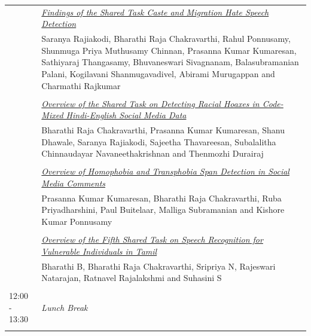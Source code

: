 \documentclass[11pt,oneside]{book}
\begin{document}
\begin{tabular}{p{24mm}p{124mm}}
                
                      & \hyperlink{page.214}{\emph{Findings of the Shared Task Caste and Migration Hate Speech Detection}}\\
        & Saranya Rajiakodi\index{Rajiakodi}, Bharathi Raja Chakravarthi\index{Chakravarthi}, Rahul Ponnusamy\index{Ponnusamy}, Shunmuga Priya Muthusamy Chinnan\index{Chinnan}, Prasanna Kumar Kumaresan\index{Kumaresan}, Sathiyaraj Thangasamy\index{Thangasamy}, Bhuvaneswari Sivagnanam\index{Sivagnanam}, Balasubramanian Palani\index{Palani}, Kogilavani Shanmugavadivel\index{Shanmugavadivel}, Abirami Murugappan\index{Murugappan} and Charmathi Rajkumar\index{Rajkumar}\\\\
                
                      & \hyperlink{page.221}{\emph{Overview of the Shared Task on Detecting Racial Hoaxes in Code-Mixed Hindi-English Social Media Data}}\\
        & Bharathi Raja Chakravarthi\index{Chakravarthi}, Prasanna Kumar Kumaresan\index{Kumaresan}, Shanu Dhawale\index{Dhawale}, Saranya Rajiakodi\index{Rajiakodi}, Sajeetha Thavareesan\index{Thavareesan}, Subalalitha Chinnaudayar Navaneethakrishnan\index{Navaneethakrishnan} and Thenmozhi Durairaj\index{Durairaj}\\\\
                
                      & \hyperlink{page.228}{\emph{Overview of Homophobia and Transphobia Span Detection in Social Media Comments}}\\
        & Prasanna Kumar Kumaresan\index{Kumaresan}, Bharathi Raja Chakravarthi\index{Chakravarthi}, Ruba Priyadharshini\index{Priyadharshini}, Paul Buitelaar\index{Buitelaar}, Malliga Subramanian\index{Subramanian} and Kishore Kumar Ponnusamy\index{Ponnusamy}\\\\
                
                      & \hyperlink{page.234}{\emph{Overview of the Fifth Shared Task on Speech Recognition for Vulnerable Individuals in Tamil}}\\
        & Bharathi B\index{B}, Bharathi Raja Chakravarthi\index{Chakravarthi}, Sripriya N\index{N}, Rajeswari Natarajan\index{Natarajan}, Ratnavel Rajalakshmi\index{Rajalakshmi} and Suhasini S\index{S}\\\\
                      12:00 - 13:30 & \emph{Lunch Break}\\\\
      
              \end{tabular}
\end{document}
